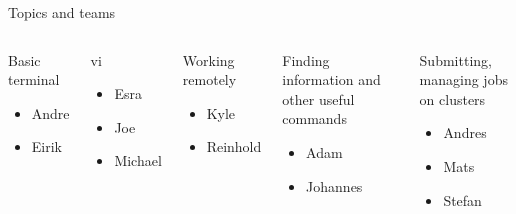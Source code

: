 \begin{frame}{Topics and teams}
\footnotesize

\begin{columns}
   \begin{block}{Basic terminal}
    \begin{itemize}
      \item Andre
      \item Eirik
    \end{itemize}
   \end{block}

   \begin{block}{vi}
    \begin{itemize}
      \item Esra
      \item Joe
      \item Michael
    \end{itemize}
   \end{block}

   \begin{block}{Working remotely}
    \begin{itemize}
      \item Kyle
      \item Reinhold
    \end{itemize}
   \end{block}

   \begin{block}{Finding information and other useful commands}
    \begin{itemize}
      \item Adam
      \item Johannes
    \end{itemize}
   \end{block}

   \begin{block}{Submitting, managing jobs on clusters}
    \begin{itemize}
      \item Andres
      \item Mats
      \item Stefan
    \end{itemize}
   \end{block}
\end{columns}

%
%
%
%
%
%
%
%
%
%
%
%
%

\end{frame}
